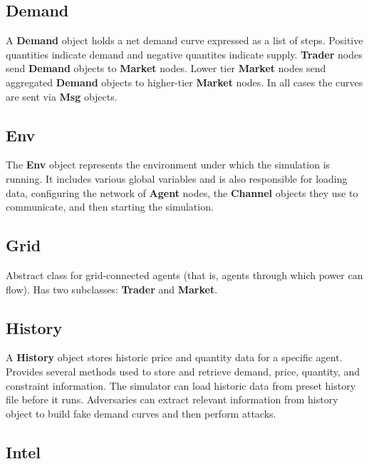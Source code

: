 \documentclass[12pt]{article}
\begin{document}
\subsection{Demand} \mbox{}
\label{subsec:objects_demand}

A \textbf{Demand} object holds a net demand curve expressed as a list of steps.
Positive quantities indicate demand and negative quantites indicate supply.
\textbf{Trader} nodes send \textbf{Demand} objects to \textbf{Market} nodes.  Lower tier 
\textbf{Market} nodes send aggregated \textbf{Demand} objects to higher-tier \textbf{Market} 
nodes.  In all cases the curves are sent via \textbf{Msg} objects.

\subsection{Env} \mbox{}
\label{subsec:objects_env}

The \textbf{Env} object represents the environment under which the simulation
is running.  It includes various global variables and is also responsible
for loading data, configuring the network of \textbf{Agent} nodes, 
the \textbf{Channel} objects they use to communicate, and then starting the
simulation.

\subsection{Grid} \mbox{}
\label{subsec:objects_grid}

Abstract class for grid-connected agents (that is, agents through
which power can flow).  Has two subclasses: \textbf{Trader} and \textbf{Market}.

\subsection{History} \mbox{}
\label{subsec:objects_history}

A \textbf{History} object stores historic price and quantity data for a specific 
agent. Provides several methods used to store and retrieve demand, 
price, quantity, and constraint information. The simulator can load historic 
data from preset history file before it runs. Adversaries can extract 
relevant information from history object to build fake demand curves 
and then perform attacks.

\subsection{Intel} \mbox{}
\label{subsec:objects_intel}
\end{document}
